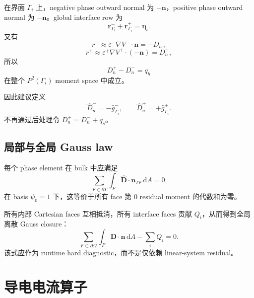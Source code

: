 \documentclass[UTF8,a4paper,11pt]{ctexart}
\newcommand{\dd}{\mathrm{d}}
\newcommand{\eps}{\varepsilon}
\newcommand{\vct}[1]{\bm{#1}}
\begin{document}
在界面 \(\Gamma_i\) 上，negative phase outward normal 为 \(+\vct n\)，positive phase outward normal 为 \(-\vct n\)。global interface row 为
\begin{equation}
\boxed{
\vct r^-_{\Gamma_i}+\vct r^+_{\Gamma_i}=\vct\eta_i.
}
\label{eq:interface_row}
\end{equation}
又有
\[
r^-\approx\eps^-\nabla V^-\cdot\vct n=-D_n^-,
\]
\[
r^+\approx\eps^+\nabla V^+\cdot(-\vct n)=D_n^+,
\]
所以
\begin{equation}
\boxed{D_n^+-D_n^-=q_h}
\label{eq:discrete_D_jump}
\end{equation}
在整个 \(P^2(\Gamma_i)\) moment space 中成立。

因此建议定义
\begin{equation}
\boxed{
\widehat D_n^-=-\widehat g^-_{\Gamma_i},
\qquad
\widehat D_n^+=+\widehat g^+_{\Gamma_i}.
}
\label{eq:D_traces}
\end{equation}
不再通过后处理令 \(D_n^+=D_n^-+q_s\)。

\subsection{局部与全局 Gauss law}

每个 phase element 在 bulk 中应满足
\begin{equation}
\boxed{
\sum_{F\in\partial T}
\int_F\widehat{\vct D}\cdot\vct n_{TF}\,\dd A=0.
}
\label{eq:local_gauss}
\end{equation}
在 basis \(\psi_0=1\) 下，这等价于所有 face 第 0 residual moment 的代数和为零。

所有内部 Cartesian faces 互相抵消，所有 interface faces 贡献 \(Q_i\)，从而得到全局离散 Gauss closure：
\begin{equation}
\boxed{
\sum_{F\subset\partial\Omega}
\int_F\vct D\cdot\vct n\,\dd A
-
\sum_iQ_i=0.
}
\label{eq:global_gauss}
\end{equation}
该式应作为 runtime hard diagnostic，而不是仅依赖 linear-system residual。

\section{导电电流算子}
\end{document}
